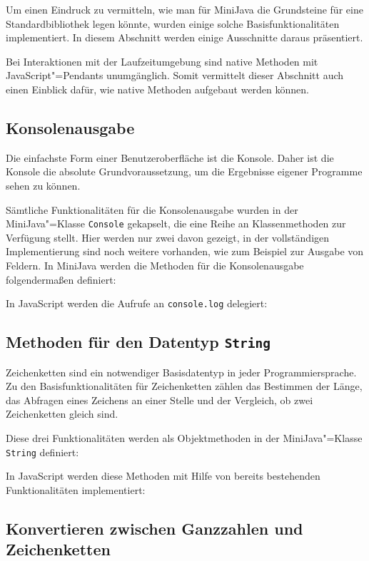 Um einen Eindruck zu vermitteln, wie man für MiniJava die Grundsteine für eine Standardbibliothek legen könnte, wurden einige solche Basisfunktionalitäten implementiert. In diesem Abschnitt werden einige Ausschnitte daraus präsentiert.

Bei Interaktionen mit der Laufzeitumgebung sind native Methoden mit JavaScript"=Pendants unumgänglich. Somit vermittelt dieser Abschnitt auch einen Einblick dafür, wie native Methoden aufgebaut werden können.

\subsection{Konsolenausgabe}
Die einfachste Form einer Benutzeroberfläche ist die Konsole. Daher ist die Konsole die absolute Grundvoraussetzung, um die Ergebnisse eigener Programme sehen zu können.

Sämtliche Funktionalitäten für die Konsolenausgabe wurden in der MiniJava"=Klasse \lstinline{Console} gekapselt, die eine Reihe an Klassenmethoden zur Verfügung stellt. Hier werden nur zwei davon gezeigt, in der vollständigen Implementierung sind noch weitere vorhanden, wie zum Beispiel zur Ausgabe von Feldern. In MiniJava werden die Methoden für die Konsolenausgabe folgendermaßen definiert:


In JavaScript werden die Aufrufe an \lstinline{console.log} delegiert:


\subsection{Methoden für den Datentyp \lstinline{String}}

Zeichenketten sind ein notwendiger Basisdatentyp in jeder Programmiersprache. Zu den Basisfunktionalitäten für Zeichenketten zählen das Bestimmen der Länge, das Abfragen eines Zeichens an einer Stelle und der Vergleich, ob zwei Zeichenketten gleich sind.

Diese drei Funktionalitäten werden als Objektmethoden in der MiniJava"=Klasse \lstinline{String} definiert:


In JavaScript werden diese Methoden mit Hilfe von bereits bestehenden Funktionalitäten implementiert:


\subsection{Konvertieren zwischen Ganzzahlen und Zeichenketten}

